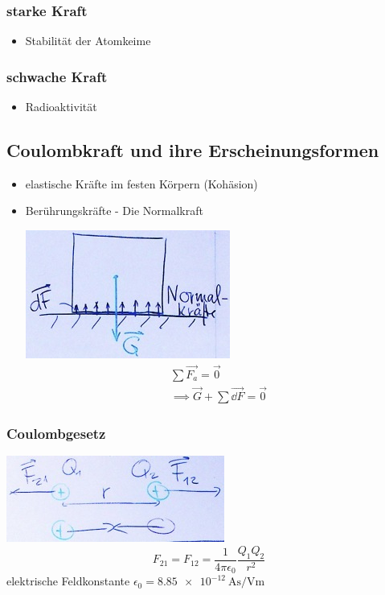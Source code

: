 \subsubsection{starke Kraft}
\begin{itemize}[ label = $\rightarrow$ ]
	\item Stabilität der Atomkeime
\end{itemize}

\subsubsection{schwache Kraft}
\begin{itemize}[ label = $\rightarrow$ ]
	\item Radioaktivität
\end{itemize}

\subsection{Coulombkraft und ihre Erscheinungsformen}
\begin{itemize}
	\item elastische Kräfte im festen Körpern (Kohäsion)
	\item Berührungskräfte - Die Normalkraft
		\begin{bsp*}[ note = Quader auf Tisch in Ruhe ]
			\includegraphics{Bild24}
			\begin{gather*}
				\sum \vec{F_a} = \vec{0} \\
				\implies \vec{G} + \sum \vec{\dd F} = \vec{0}
			\end{gather*}
		\end{bsp*}
\end{itemize}

\subsubsection{Coulombgesetz}
\includegraphics{Bild25}
\[ F_{21} = F_{12} = \frac{1}{4 \pi \epsilon_0} \frac{Q_1 Q_2}{r^2} \]
elektrische Feldkonstante $\epsilon_0 = \SI{8.85e-12}{\ampere\second\per\volt\metre}$

